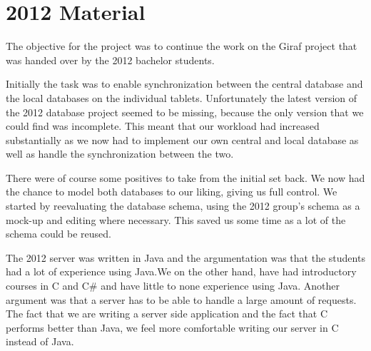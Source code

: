 \section{2012 Material}
The objective for the project was to continue the work on the Giraf project that was handed over by the 2012 bachelor students. 

Initially the task was to enable synchronization between the central database and the local databases on the individual tablets. Unfortunately the latest version of the 2012 database project seemed to be missing, because the only version that we could find was incomplete. This meant that our workload had increased substantially as we now had to implement our own central and local database as well as handle the synchronization between the two.

There were of course some positives to take from the initial set back. We now had the chance to model both databases to our liking, giving us full control. We started by reevaluating the database schema, using the 2012 group's schema as a mock-up and editing where necessary. This saved us some time as a lot of the schema could be reused.

The 2012 server was written in Java and the argumentation was that the students had a lot of experience using Java.We on the other hand, have had introductory courses in C and C\# and have little to none experience using Java. Another argument was that a server has to be able to handle a large amount of requests. The fact that we are writing a server side application and the fact that C performs better than Java, we feel more comfortable writing our server in C instead of Java.